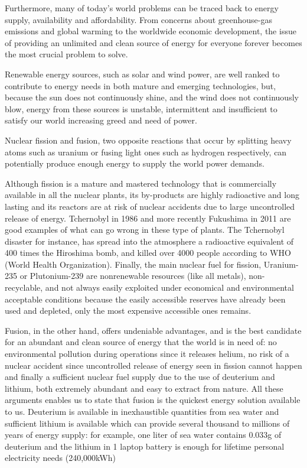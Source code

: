 \documentclass[12pt,lot, lof]{puthesis}
\begin{document}
Furthermore, many of today's world problems can be traced back to energy supply, availability and affordability. From concerns about greenhouse-gas emissions and global warming to the worldwide economic development, the issue of providing an unlimited and clean source of energy for everyone forever becomes the most crucial problem to solve.

Renewable energy sources, such as solar and wind power, are well ranked to contribute to energy needs in both mature and emerging technologies, but, because the sun does not continuously shine, and the wind does not continuously  blow, energy from these sources is unstable, intermittent and insufficient to satisfy our world increasing greed and need of power.

Nuclear fission and fusion, two opposite reactions that occur by splitting heavy atoms such as uranium or fusing light ones such as hydrogen respectively, can potentially produce enough energy to supply the world power demands. 

Although fission is a mature and mastered technology that is commercially available in all the nuclear plants, its by-products are highly radioactive and long lasting and its reactors are at risk of nuclear accidents due to large uncontrolled release of energy. Tchernobyl in 1986 and more recently Fukushima in 2011 are good examples of what can go wrong in these type of plants. The Tchernobyl disaster for instance, has spread into the atmosphere a radioactive equivalent of 400 times the Hiroshima bomb, and killed over 4000 people according to WHO (World Health Organization). Finally, the main nuclear fuel for fission, Uranium-235 or Plutonium-239 are nonrenewable resources (like all metals), non-recyclable, and not always easily exploited under economical and environmental acceptable conditions because the easily accessible reserves have already been used and depleted, only the most expensive accessible ones remains.

%
Fusion, in the other hand, offers undeniable advantages, and is the best candidate for an abundant and clean source of energy that the world is in need of: no environmental pollution during operations since it releases helium, no risk of a nuclear accident since uncontrolled release of energy seen in fission cannot happen and finally a sufficient nuclear fuel supply due to the use of deuterium and lithium, both extremely abundant and easy to extract from nature. All these arguments enables us to state that fusion is the quickest energy solution available to us.
Deuterium is available in inexhaustible quantities from sea water and sufficient lithium is available which can provide several thousand to millions of years of energy supply: for example, one liter of sea water contains 0.033g of deuterium and the lithium in 1 laptop battery is enough for lifetime personal electricity needs (240,000kWh)
\end{document}
